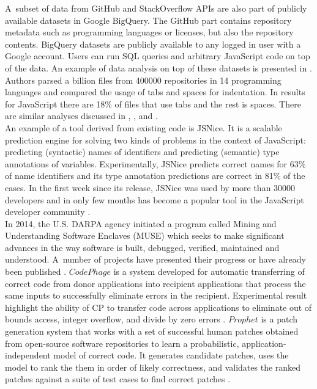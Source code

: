 \documentclass[thesis=M,english]{FITthesis}[2012/10/20]
\begin{document}
A~subset of data from GitHub and StackOverflow APIs are also part of publicly available datasets in Google BigQuery. The GitHub part contains repository metadata such as programming languages or licenses, but also the repository contents. BigQuery datasets are publicly available to any logged in user with a Google account. Users can run SQL queries and arbitrary JavaScript code on top of the data. An example of data analysis on top of these datasets is presented in \cite{bq_tabs_vs_spaces}. Authors parsed a billion files from 400000 repositories in 14 programming languages and compared the usage of tabs and spaces for indentation. In results for JavaScript there are 18\% of files that use tabs and the rest is spaces. There are similar analyses discussed in \cite{bq_jshint}, \cite{bq_java_imports}, \cite{bq_angular} and \cite{bq_go}. \\


An example of a tool derived from existing code is JSNice. It is a scalable prediction engine for solving two kinds of problems in the context of JavaScript: predicting (syntactic) names of identifiers and predicting (semantic) type annotations of variables. Experimentally, JSNice predicts correct names for 63\% of name identifiers and its type annotation predictions are correct in 81\% of the cases. In the first week since its release, JSNice was used by more than 30000 developers and in only few months has become a popular tool in the JavaScript developer community \cite{jsnice}. \\


In 2014, the U.S. DARPA agency initiated a program called Mining and Understanding Software Enclaves (MUSE) \cite{muse, darpa} which seeks to make significant advances in the way software is built, debugged, verified, maintained and understood. A~number of projects have presented their progress or have already been published \cite{muse_mit1, muse_mit2, muse_colo}. $Code Phage$ is a system developed for automatic transferring of correct code from donor applications into recipient applications that process the same inputs to successfully eliminate errors in the recipient. Experimental result highlight the ability of CP to transfer code across applications to eliminate out of bounds access, integer overflow, and divide by zero errors \cite{muse_mit1}. $Prophet$ is a patch generation system that works with a set of successful human patches obtained from open-source software repositories to learn a probabilistic, application-independent model of correct code. It generates candidate patches, uses the model to rank the them in order of likely correctness, and validates the ranked patches against a suite of test cases to find correct patches \cite{muse_mit2}.  \\
\end{document}
